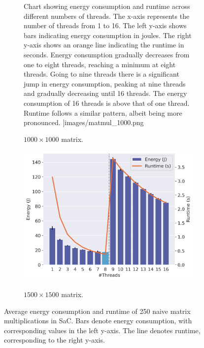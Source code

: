 \begin{figure}[!ht]
\begin{subfigure}{0.33\linewidth}
{            Chart showing energy consumption and runtime across different numbers of threads. The
            x-axis represents the number of threads from 1 to 16. The left y-axis shows bars
            indicating energy consumption in joules. The right y-axis shows an orange line
            indicating the runtime in seconds. Energy consumption gradually decreases from one to
            eight threads, reaching a minimum at eight threads. Going to nine threads there is a
            significant jump in energy consumption, peaking at nine threads and gradually decreasing
            until 16 threads. The energy consumption of 16 threads is above that of one thread.
            Runtime follows a similar pattern, albeit being more pronounced.
        }]{images/matmul_1000.png}
        \caption{$1000 \times 1000$ matrix.}
        \label{fig:matmul2}
    \end{subfigure}%
    \begin{subfigure}{0.33\linewidth}
        \includegraphics[width=\linewidth,alt={
            Chart showing energy consumption and runtime across different numbers of threads. The
            x-axis represents the number of threads from 1 to 16. The left y-axis shows bars
            indicating energy consumption in joules. The right y-axis shows an orange line
            indicating the runtime in seconds. Energy consumption gradually decreases from one to
            eight threads, reaching a minimum at eight threads. Going to nine threads there is a
            significant jump in energy consumption, peaking at nine threads and gradually decreasing
            until 16 threads. The energy consumption of 16 threads is above that of one thread.
            Runtime follows a similar pattern, albeit being more pronounced.
        }]{images/matmul_1500.png}
        \caption{$1500 \times 1500$ matrix.}
        \label{fig:matmul3}
    \end{subfigure}%
    \caption{Average energy consumption and runtime of 250 naive matrix multiplications in SaC.
    Bars denote energy consumption, with corresponding values in the left y-axis.
    The line denotes runtime, corresponding to the right y-axis.}
    \label{fig:matmul}
\end{figure}

